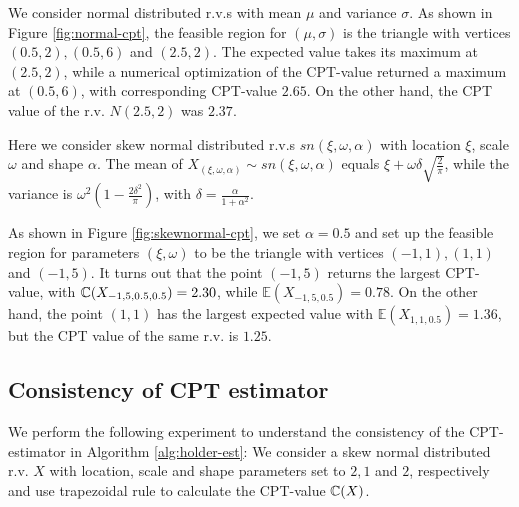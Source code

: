 \begin{example}
We consider normal distributed r.v.s with mean $\mu$ and variance $\sigma$. As shown in Figure \ref{fig:normal-cpt}, the feasible region for $(\mu, \sigma)$ is the triangle with vertices $(0.5,2), (0.5,6)$ and $(2.5,2)$. The expected value takes its maximum at $(2.5, 2)$, while a numerical optimization of the CPT-value returned a maximum at $(0.5, 6)$, with corresponding CPT-value $2.65$. On the other hand, the CPT value of the r.v. $N(2.5, 2)$ was $2.37$.
\end{example}

\begin{example}
Here we consider skew normal distributed r.v.s $sn(\xi, \omega, \alpha)$ with location $\xi$, scale $\omega$ and shape $\alpha$.  
The mean of $X_{(\xi, \omega, \alpha)} \sim sn(\xi, \omega, \alpha)$ equals 
$\xi + \omega \delta \sqrt{\frac{2}{\pi}}$, while the  variance is
$\omega^2(1 - \frac{2\delta^2}{\pi})$, with $\delta = \frac{\alpha}{1 + \alpha^2}$.

As shown in Figure \ref{fig:skewnormal-cpt}, we set $\alpha=0.5$ and set up the feasible region for parameters $(\xi, \omega)$ to be the triangle with vertices $(-1,1), (1,1)$ and $(-1,5)$.  
It turns out that the point $(-1,5)$ returns the largest CPT-value, with $\mathbb{C}(X_{-1,5,0.5,0.5}) = 2.30$, while
$\mathbb{E}(X_{-1,5,0.5}) = 0.78$.
On the other hand, the point $(1,1)$ has the largest expected value with $\mathbb{E}(X_{1,1,0.5}) = 1.36$, but the CPT value of the same r.v. is $1.25$.
\end{example}


\subsection{Consistency of CPT estimator}
We perform the following experiment to understand the consistency of the CPT-estimator in Algorithm \ref{alg:holder-est}:
We consider a skew normal distributed  r.v. $X$ with location, scale and shape parameters set to $2,1$ and $2$, respectively and use 
trapezoidal rule to calculate the CPT-value $\mathbb{C}(X)$. 

